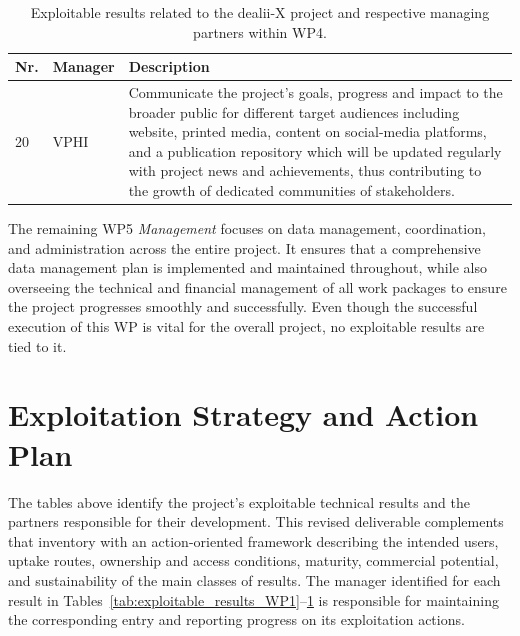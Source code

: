 \documentclass[a4paper,12pt]{article}
\begin{document}
\begin{center}
    \small
    \renewcommand{\arraystretch}{1.25}
    \begin{longtable}{|l|p{2.5cm}|p{12cm}|}
    \caption{Exploitable results related to the dealii-X project and respective managing partners within WP4.}
    \label{tab:exploitable_results_WP4}
    \\
    \hline
    \textbf{Nr.} & \textbf{Manager} & \textbf{Description} \\
    \hline
    20 & VPHI &
    Communicate the project's goals, progress and impact to the broader public for different target audiences including website, printed media, content on social-media platforms, and a publication repository which will be updated regularly with project news and achievements, thus contributing to the growth of dedicated communities of stakeholders.
    \\
    \hline
    \end{longtable}
\end{center}

The remaining WP5 \textit{Management} focuses on data management, coordination, and administration across the entire project. It ensures that a comprehensive data management plan is implemented and maintained throughout, while also overseeing the technical and financial management of all work packages to ensure the project progresses smoothly and successfully. Even though the successful execution of this WP is vital for the overall project, no exploitable results are tied to it.


\section{Exploitation Strategy and Action Plan}
\label{sec:exploitation_strategy}

The tables above identify the project's exploitable technical results and
the partners responsible for their development. This revised deliverable
complements that inventory with an action-oriented framework describing the
intended users, uptake routes, ownership and access conditions, maturity,
commercial potential, and sustainability of the main classes of results.
The manager identified for each result in
Tables~\ref{tab:exploitable_results_WP1}--\ref{tab:exploitable_results_WP4}
is responsible for maintaining the corresponding entry and reporting
progress on its exploitation actions.
\end{document}
